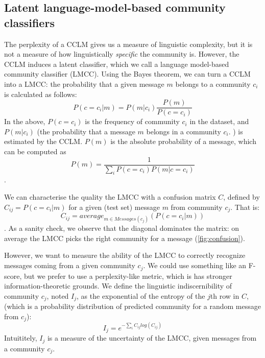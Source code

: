 \documentclass[11pt,a4paper]{article}
\newcommand\Ind{I}
\begin{document}
\subsection{Latent language-model-based community classifiers}

The perplexity of a CCLM gives us a measure of linguistic complexity,
but it is not a measure of how linguistically \emph{specific} the
community is. However, the CCLM induces a latent classifier,
which we call a language model-based community classifier
(LMCC). Using the Bayes theorem, we can turn a
CCLM into a LMCC: the probability that a given message $m$
belongs to a community $c_i$ is calculated as follows:
\[P(c=c_i | m) = P(m | c_i)\frac {P(m)} {P(c=c_i)}\]
In the above,
$P(c=c_i)$ is the frequency of community $c_i$ in the dataset, and
$P(m | c_i)$ (the probability that a message $m$
belongs in a community $c_i$. ) is estimated by the CCLM. $P(m)$ is the absolute
probability of a message, which can be computed as
\[P(m) = \frac 1 {\sum_i P(c=c_i) P(m|c=c_i ) }\].

We can characterise the quality the LMCC with a confusion matrix
$C$, defined by $C_{ij} = P(c=c_i | m)$ for a given (test set) message $m$ 
from community $c_j$. 
That is: \[C_{ij} = average_{m \in Messages(c_j)}(P(c=c_i | m))\].
As a sanity check, we observe that the diagonal dominates the matrix: on average the LMCC picks the right community for a message (\cref{fig:confusion}).

\begin{figure*}
\caption{LMCC confusion matrices for the best LSTM (left, $c=1$) and transformer (right, $c=3$) models.}
\label{fig:confusion}
\end{figure*}

However, we want to measure the ability of the LMCC to correctly
recognize messages coming from a given community $c_j$. We could use
something like an F-score, but we prefer to use a perplexity-like metric,
which is has stronger information-theoretic grounds.
We define the linguistic indiscernibility of community $c_j$, noted $\Ind_j$, 
as the exponential of the entropy of the $j$th row in \(C\),
(which is a probability distribution
of predicted community for a random message from $c_j$):
\[\Ind_j = e^{-\sum_i C_{ij} log(C_{ij})}\]
Intuititely, $\Ind_j$ is a measure of the uncertainty of the LMCC,
given messages from a community $c_j$.
\end{document}
